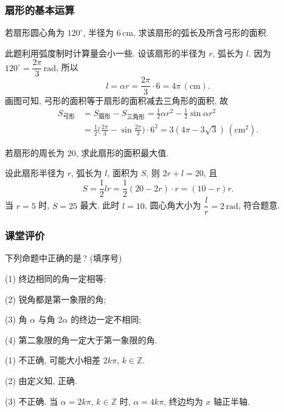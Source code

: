 \subsubsection{扇形的基本运算}
\begin{example}
    若扇形圆心角为 $120^\circ$, 半径为 6\,cm, 求该扇形的弧长及所含弓形的面积.
\end{example}
\beginsolution
    此题利用弧度制时计算量会小一些. 设该扇形的半径为 $r$, 弧长为 $l$. 因为 $120^\circ= \dfrac{2\pi}{3}\,\mathrm{rad}$, 所以
    \[l= \alpha r= \dfrac{2\pi}{3}\cdot 6= 4\pi\,(\mathrm{cm}).\]
    画图可知, 弓形的面积等于扇形的面积减去三角形的面积, 
    故
    \[\begin{aligned}
        S_{\text{弓形}}
        &= S_{\text{扇形}}- S_{\text{三角形}}
            = \frac12\alpha r^2- \frac12\sin\alpha r^2\\
        &= \frac12\biggl(\frac{2\pi}{3}- \sin\frac{2\pi}{3}\biggr)\cdot 6^2
            = 3(4\pi- 3\sqrt3)\,(\mathrm{cm}^2).
    \end{aligned}\]
\endsolution

\lianxi
\begin{exercise}[s]
    若扇形的周长为 $20$, 求此扇形的面积最大值.
\end{exercise}
\beginsolution
    设此扇形半径为 $r$, 弧长为 $l$, 面积为 $S$, 则 $2r+l=20$, 且
    \[S= \frac12lr= \frac12(20-2r)\cdot r
        = (10-r)r.\]
    当 $r=5$ 时, $S=25$ 最大. 
    此时 $l=10$, 圆心角大小为 $\dfrac{l}r= 2\,\mathrm{rad}$, 符合题意.
\endsolution

\subsubsection{课堂评价}
\begin{exercise}
    下列命题中正确的是\,? (填序号)
  
    (1) 终边相同的角一定相等;
  
    (2) 锐角都是第一象限的角;
  
    (3) 角 $\alpha$ 与角 $2\alpha$ 的终边一定不相同;
  
    (4) 第二象限的角一定大于第一象限的角.
\end{exercise}
\beginsolution
    (1) 不正确, 可能大小相差 $2k\pi$, $k\in\mathbb{Z}$.

    (2) 由定义知, 正确.

    (3) 不正确. 当 $\alpha=2k\pi$, $k\in\mathbb{Z}$ 时, $\alpha=4k\pi$, 终边均为 $x$ 轴正半轴.

